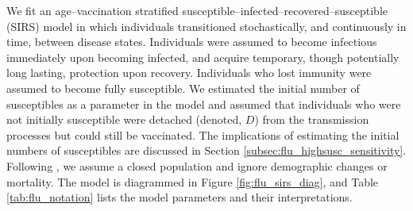 We fit an age--vaccination stratified susceptible--infected--recovered--susceptible (SIRS) model in which individuals transitioned stochastically, and continuously in time, between disease states. Individuals were assumed to become infectious immediately upon becoming infected, and acquire temporary, though potentially long lasting, protection upon recovery. Individuals who lost immunity were assumed to become fully susceptible. We estimated the initial number of susceptibles as a parameter in the model and assumed that individuals who were not initially susceptible were detached (denoted, $ D $) from the transmission processes but could still be vaccinated. The implications of estimating the initial numbers of susceptibles are discussed in Section \ref{subsec:flu_highsusc_sensitivity}. Following \cite{shubin2016revealing}, we assume a closed population and ignore demographic changes or mortality. The model is diagrammed in Figure \ref{fig:flu_sirs_diag}, and Table \ref{tab:flu_notation} lists the model parameters and their interpretations. 

